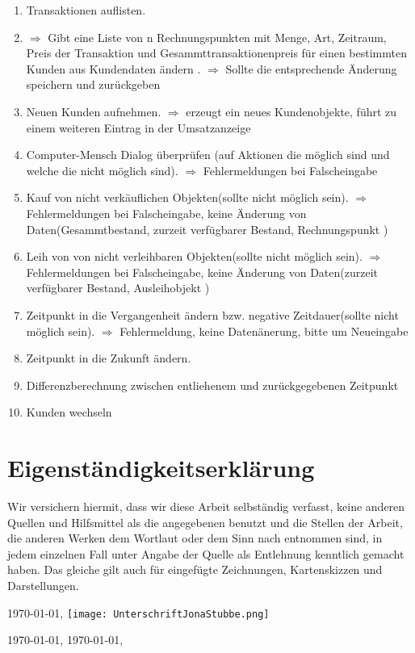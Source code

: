 \documentclass[a4paper,12pt,titlepage]{article}
\begin{document}
\begin{enumerate}
\item
Transaktionen auflisten.
\item
$\Rightarrow$ Gibt eine Liste von n Rechnungspunkten mit Menge, Art, Zeitraum, Preis der Transaktion und Gesammttransaktionenpreis für einen bestimmten Kunden aus
Kundendaten ändern .
$\Rightarrow$ Sollte die entsprechende Änderung speichern und zurückgeben
\item
Neuen Kunden aufnehmen.
$\Rightarrow$ erzeugt ein neues Kundenobjekte, führt zu einem weiteren Eintrag in der Umsatzanzeige
\item
Computer-Mensch Dialog überprüfen (auf Aktionen die möglich sind und welche die nicht möglich sind).
$\Rightarrow$ Fehlermeldungen bei Falscheingabe
\item
Kauf von nicht verkäuflichen Objekten(sollte nicht möglich sein).
$\Rightarrow$ Fehlermeldungen bei Falscheingabe, keine Änderung von Daten(Gesammtbestand, zurzeit verfügbarer Bestand, Rechnungspunkt )
\item
Leih von von nicht verleihbaren Objekten(sollte nicht möglich sein).
$\Rightarrow$ Fehlermeldungen bei Falscheingabe, keine Änderung von Daten(zurzeit verfügbarer Bestand, Ausleihobjekt )
\item
Zeitpunkt in die Vergangenheit ändern bzw. negative Zeitdauer(sollte nicht möglich sein).
$\Rightarrow$ Fehlermeldung, keine Datenänerung, bitte um Neueingabe
\item
Zeitpunkt in die Zukunft ändern.
\item
Differenzberechnung zwischen entliehenem und zurückgegebenen Zeitpunkt
\item
Kunden wechseln


\end{enumerate}
\appendix
\newpage
\part{Eigenständigkeitserklärung}
Wir versichern hiermit, dass wir diese Arbeit selbständig verfasst, keine anderen Quellen und Hilfsmittel
als die angegebenen benutzt und die Stellen der Arbeit, die anderen Werken dem Wortlaut oder dem Sinn nach entnommen sind,
in jedem einzelnen Fall unter Angabe der Quelle als Entlehnung kenntlich gemacht haben.
Das gleiche gilt auch für eingefügte Zeichnungen, Kartenskizzen und Darstellungen.

\today, \texttt{[image: UnterschriftJonaStubbe.png]}

\today, 
\today,
\end{document}
